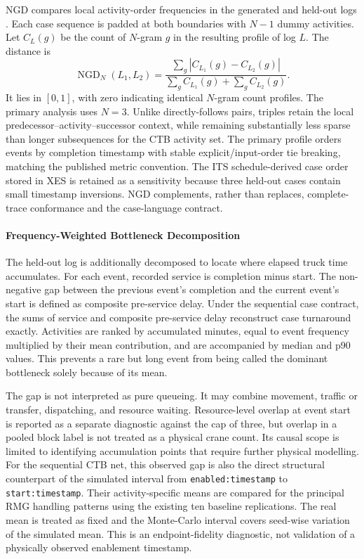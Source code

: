 NGD compares local activity-order frequencies in the generated and held-out
logs \cite{ChapelaCampa2023Trust,Chapela2025SimQuality}. Each case sequence is
padded at both boundaries with $N-1$ dummy activities. Let $C_L(g)$ be the
count of $N$-gram $g$ in the resulting profile of log $L$. The distance is
\begin{equation}
    \operatorname{NGD}_N(L_1,L_2)
    =
    \frac{\sum_g\left|C_{L_1}(g)-C_{L_2}(g)\right|}
         {\sum_g C_{L_1}(g)+\sum_g C_{L_2}(g)}.
\end{equation}
It lies in $[0,1]$, with zero indicating identical $N$-gram count profiles. The
primary analysis uses $N=3$. Unlike directly-follows pairs, triples retain the
local predecessor--activity--successor context, while remaining substantially
less sparse than longer subsequences for the CTB activity set. The primary
profile orders events by completion timestamp with stable explicit/input-order
tie breaking, matching the published metric convention. The ITS
schedule-derived case order stored in XES is retained as a sensitivity because
three held-out cases contain small
timestamp inversions. NGD complements, rather than replaces, complete-trace
conformance and the case-language contract.

\paragraph{Frequency-Weighted Bottleneck Decomposition}

The held-out log is additionally decomposed to locate where elapsed truck time
accumulates. For each event, recorded service is completion minus start. The
non-negative gap between the previous event's completion and the current
event's start is defined as composite pre-service delay. Under the sequential
case contract, the sums of service and composite pre-service delay reconstruct
case turnaround exactly. Activities are ranked by accumulated minutes, equal
to event frequency multiplied by their mean contribution, and are accompanied
by median and p90 values. This prevents a rare but long event from being called
the dominant bottleneck solely because of its mean.

The gap is not interpreted as pure queueing. It may combine movement,
traffic or transfer, dispatching, and resource waiting. Resource-level overlap
at event start is reported as a separate diagnostic against the cap of three,
but overlap in a pooled block label is not treated as a physical crane count.
Its causal scope is limited to identifying accumulation points that require
further physical modelling. For the sequential CTB net, this observed gap is
also the direct structural counterpart of the simulated interval from
\texttt{enabled:timestamp} to \texttt{start:timestamp}. Their activity-specific
means are compared for the principal RMG handling patterns using the existing
ten baseline replications. The real mean is treated as fixed and the
Monte-Carlo interval covers seed-wise variation of the simulated mean. This is
an endpoint-fidelity diagnostic, not validation of a physically observed
enablement timestamp.

